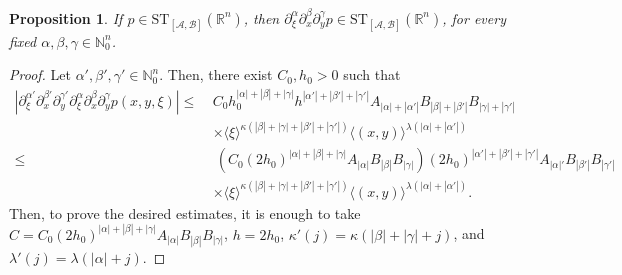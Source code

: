 \documentclass[11pt,reqno]{amsart}
\numberwithin{equation}{section}
\newtheorem{proposition}[theorem]{Proposition}
\newcommand{\ST}{{\mathrm{ST}}}
\newcommand{\A}{{\mathcal{A}}} %
\newcommand{\B}{{\mathcal{B}}} %
\begin{document}
\begin{proposition}\label{der_ST}
	If $p\in \ST_{[\A,\B]}(\mathbb{R}^n)$, then $\partial_\xi^\alpha\partial_x^\beta\partial_y^\gamma p\in \ST_{[\A,\B]}(\mathbb{R}^n)$, for every fixed $\alpha,\beta,\gamma\in\mathbb{N}_0^n$.
\end{proposition}
%
\begin{proof}
	Let $\alpha',\beta',\gamma'\in\mathbb{N}_0^n$. Then, there exist $C_0,h_0>0$ such that
	\begin{align*}
		|\partial_\xi^{\alpha'}\partial_x^{\beta'}\partial_y^{\gamma'} \partial_\xi^{\alpha}\partial_x^{\beta}\partial_y^{\gamma} p(x,y,\xi)| \leq\ & C_0h_0^{|\alpha|+|\beta|+|\gamma|}h^{|\alpha'|+|\beta'|+|\gamma'|} A_{|\alpha|+|\alpha'|}B_{|\beta|+|\beta'|}B_{|\gamma|+|\gamma'|} \\
		& \times \langle\xi\rangle^{\kappa(|\beta|+|\gamma|+|\beta'|+|\gamma'|)} \langle (x,y)\rangle^{\lambda(|\alpha|+|\alpha'|)} \\
		\leq &\ \left( C_0 (2h_0)^{|\alpha|+|\beta|+|\gamma|} A_{|\alpha|} B_{|\beta|} B_{|\gamma|} \right) (2h_0)^{|\alpha'|+|\beta'|+|\gamma'|}A_{|\alpha|'} B_{|\beta'|} B_{|\gamma'|}\\
		& \times \langle\xi\rangle^{\kappa(|\beta|+|\gamma|+|\beta'|+|\gamma'|)} \langle (x,y)\rangle^{\lambda(|\alpha|+|\alpha'|)}.
	\end{align*}
	Then, to prove the desired estimates, it is enough to take $C = C_0(2h_0)^{|\alpha|+|\beta|+|\gamma|}A_{|\alpha|} B_{|\beta|} B_{|\gamma|}$, $h=2h_0$, $\kappa'(j)=\kappa(|\beta|+|\gamma|+j)$, and $\lambda'(j)=\lambda(|\alpha|+j)$.
\end{proof}
\end{document}
